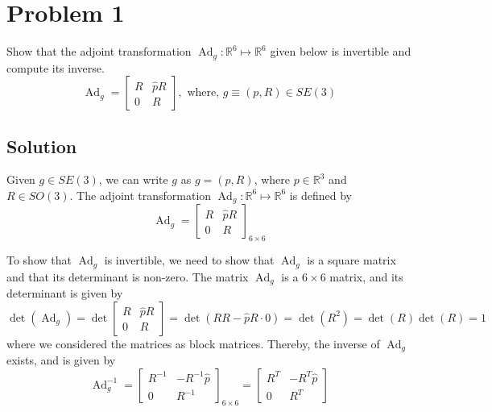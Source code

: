 \section*{Problem 1}

Show that the adjoint transformation \( \operatorname{Ad}_{g}: \mathbb{R}^{6} \mapsto \mathbb{R}^{6} \) given below is invertible and compute its inverse.
\[
    \operatorname{Ad}_{g}=\left[\begin{array}{cc}
            R & \widehat{p} R \\
            0 & R
        \end{array}\right], \text { where, } g \equiv(p, R) \in SE(3)
\]

\subsection*{Solution}

Given \( g \in SE(3) \), we can write \( g \) as \( g = (p, R) \), where \( p \in \mathbb{R}^{3} \) and \( R \in SO(3) \). The adjoint transformation \( \operatorname{Ad}_{g}: \mathbb{R}^{6} \mapsto \mathbb{R}^{6} \) is defined by
\begin{equation*}
    \operatorname{Ad}_{g}
    =
    \begin{bmatrix}
        R & \widehat{p} R \\
        0 & R
    \end{bmatrix}_{6 \times 6}
\end{equation*}

To show that \( \operatorname{Ad}_{g} \) is invertible, we need to show that \( \operatorname{Ad}_{g} \) is a square matrix and that its determinant is non-zero.
The matrix \( \operatorname{Ad}_{g} \) is a \( 6 \times 6 \) matrix, and its determinant is given by
\begin{equation*}
    \det(\operatorname{Ad}_{g})
    =
    \det
    \begin{bmatrix}
        R & \widehat{p} R \\
        0 & R
    \end{bmatrix}
    =
    \det( R R - \widehat{p} R \cdot 0 )
    =
    \det(R^{2})
    =
    \det(R) \det(R)
    =
    1
\end{equation*}
where we considered the matrices as block matrices.
Thereby, the inverse of \( \operatorname{Ad}_{g} \) exists, and is given by
\begin{equation*}
    \boxed{
    \operatorname{Ad}_{g}^{-1}
    =
    \begin{bmatrix}
        R^{-1} & -R^{-1} \widehat{p} \\
        0      & R^{-1}
    \end{bmatrix}_{6 \times 6}
    =
    \begin{bmatrix}
        R^{T} & -R^{T} \widehat{p} \\
        0     & R^{T}
    \end{bmatrix}
    }
\end{equation*}

